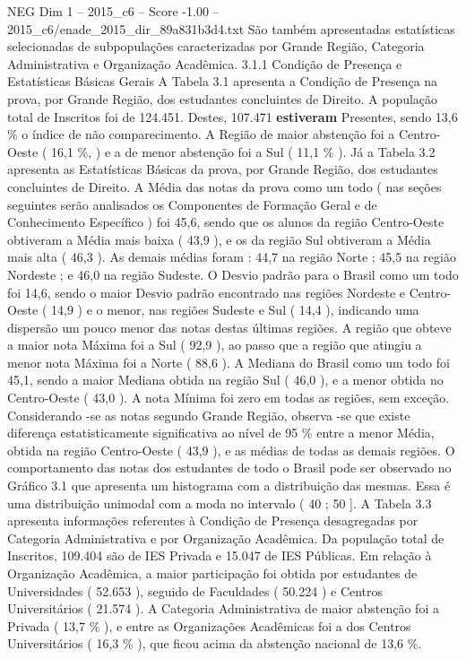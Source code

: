 \begin{textsample}{NEG Dim 1 – 2015\_c6 – Score -1.00 – 2015\_c6/enade\_2015\_dir\_89a831b3d4.txt}
São também apresentadas estatísticas selecionadas de subpopulações caracterizadas por Grande Região, Categoria Administrativa e Organização Acadêmica. 3.1.1 Condição de Presença e Estatísticas Básicas Gerais A Tabela 3.1 apresenta a Condição de Presença na prova, por Grande Região, dos estudantes concluintes de Direito.
A população total de Inscritos foi de 124.451.
Destes, 107.471 \textbf{estiveram} Presentes, sendo 13,6 \% o índice de não comparecimento.
A Região de maior abstenção foi a Centro-Oeste ( 16,1 \%, ) e a de menor abstenção foi a Sul ( 11,1 \% ).
Já a Tabela 3.2 apresenta as Estatísticas Básicas da prova, por Grande Região, dos estudantes concluintes de Direito.
A Média das notas da prova como um todo ( nas seções seguintes serão analisados os Componentes de Formação Geral e de Conhecimento Específico ) foi 45,6, sendo que os alunos da região Centro-Oeste obtiveram a Média mais baixa ( 43,9 ), e os da região Sul obtiveram a Média mais alta ( 46,3 ).
As demais médias foram : 44,7 na região Norte ; 45,5 na região Nordeste ; e 46,0 na região Sudeste.
O Desvio padrão para o Brasil como um todo foi 14,6, sendo o maior Desvio padrão encontrado nas regiões Nordeste e Centro-Oeste ( 14,9 ) e o menor, nas regiões Sudeste e Sul ( 14,4 ), indicando uma dispersão um pouco menor das notas destas últimas regiões.
A região que obteve a maior nota Máxima foi a Sul ( 92,9 ), ao passo que a região que atingiu a menor nota Máxima foi a Norte ( 88,6 ).
A Mediana do Brasil como um todo foi 45,1, sendo a maior Mediana obtida na região Sul ( 46,0 ), e a menor obtida no Centro-Oeste ( 43,0 ).
A nota Mínima foi zero em todas as regiões, sem exceção.
Considerando -se as notas segundo Grande Região, observa -se que existe diferença estatisticamente significativa ao nível de 95 \% entre a menor Média, obtida na região Centro-Oeste ( 43,9 ), e as médias de todas as demais regiões.
O comportamento das notas dos estudantes de todo o Brasil pode ser observado no Gráfico 3.1 que apresenta um histograma com a distribuição das mesmas.
Essa é uma distribuição unimodal com a moda no intervalo ( 40 ; 50 ].
A Tabela 3.3 apresenta informações referentes à Condição de Presença desagregadas por Categoria Administrativa e por Organização Acadêmica.
Da população total de Inscritos, 109.404 são de IES Privada e 15.047 de IES Públicas.
Em relação à Organização Acadêmica, a maior participação foi obtida por estudantes de Universidades ( 52.653 ), seguido de Faculdades ( 50.224 ) e Centros Universitários ( 21.574 ).
A Categoria Administrativa de maior abstenção foi a Privada ( 13,7 \% ), e entre as Organizações Acadêmicas foi a dos Centros Universitários ( 16,3 \% ), que ficou acima da abstenção nacional de 13,6 \%.

\end{textsample}
